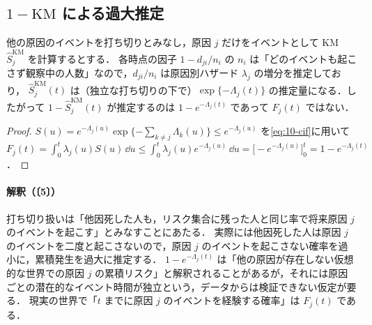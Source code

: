 \subsection{\texorpdfstring{$1-\mathrm{KM}$}{1−KM} による過大推定}\label{subsec:10-compete-km}
\Hinshutsu 他の原因のイベントを打ち切りとみなし，原因 $j$ だけをイベントとして KM $\hat S_j^{\mathrm{KM}}$ を計算するとする．
各時点の因子 $1-d_{ji}/n_i$ の $n_i$ は「どのイベントも起こさず観察中の人数」なので，$d_{ji}/n_i$ は原因別ハザード $\lambda_j$ の増分を推定しており，
$\hat S_j^{\mathrm{KM}}(t)$ は（独立な打ち切りの下で）$\exp\{-\Lambda_j(t)\}$ の推定量になる．したがって $1-\hat S_j^{\mathrm{KM}}(t)$ が推定するのは $1-e^{-\Lambda_j(t)}$ であって $F_j(t)$ ではない．
\begin{proof}
$S(u)=e^{-\Lambda_j(u)}\exp\{-\sum_{k\ne j}\Lambda_k(u)\}\le e^{-\Lambda_j(u)}$ を\cref{eq:10-cif}に用いて
$F_j(t)=\int_0^t\lambda_j(u)S(u)\,\dd u\le\int_0^t\lambda_j(u)e^{-\Lambda_j(u)}\,\dd u=\bigl[-e^{-\Lambda_j(u)}\bigr]_0^t=1-e^{-\Lambda_j(t)}$．
\end{proof}
\paragraph{解釈（〔5〕）}
打ち切り扱いは「他因死した人も，リスク集合に残った人と同じ率で将来原因 $j$ のイベントを起こす」とみなすことにあたる．
実際には他因死した人は原因 $j$ のイベントを二度と起こさないので，原因 $j$ のイベントを起こさない確率を過小に，累積発生を過大に推定する．
$1-e^{-\Lambda_j(t)}$ は「他の原因が存在しない仮想的な世界での原因 $j$ の累積リスク」と解釈されることがあるが，それには原因ごとの潜在的なイベント時間が独立という，データからは検証できない仮定が要る．
現実の世界で「$t$ までに原因 $j$ のイベントを経験する確率」は $F_j(t)$ である．

